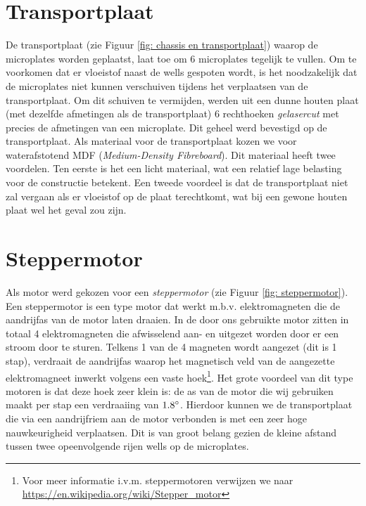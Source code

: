 \documentclass[a4paper,twoside,kulak]{kulakreport} %
\begin{document}
\section{Transportplaat}

De transportplaat (zie Figuur \ref{fig: chassis en transportplaat}) waarop de microplates worden geplaatst, laat toe om 6 microplates tegelijk te vullen. Om te voorkomen dat er vloeistof naast de wells gespoten wordt, is het noodzakelijk dat de microplates niet kunnen verschuiven tijdens het verplaatsen van de transportplaat. Om dit schuiven te vermijden, werden uit een dunne houten plaat (met dezelfde afmetingen als de transportplaat) 6 rechthoeken \textit{gelasercut} met precies de afmetingen van een microplate. Dit geheel werd bevestigd op de transportplaat. Als materiaal voor de transportplaat kozen we voor waterafstotend MDF (\textit{Medium-Density Fibreboard}). Dit materiaal heeft twee voordelen. Ten eerste is het een licht materiaal, wat een relatief lage belasting voor de constructie betekent. Een tweede voordeel is dat de transportplaat niet zal vergaan als er vloeistof op de plaat terechtkomt, wat bij een gewone houten plaat wel het geval zou zijn.  \\


\section{Steppermotor}

Als motor werd gekozen voor een \textit{steppermotor} (zie Figuur \ref{fig: steppermotor}). Een steppermotor is een type motor dat werkt m.b.v. elektromagneten die de aandrijfas van de motor laten draaien. In de door ons gebruikte motor zitten in totaal 4 elektromagneten die afwisselend aan- en uitgezet worden door er een stroom door te sturen. Telkens 1 van de 4 magneten wordt aangezet (dit is 1 stap), verdraait de aandrijfas waarop het magnetisch veld van de aangezette elektromagneet inwerkt volgens een vaste hoek\footnote{Voor meer informatie i.v.m. steppermotoren verwijzen we naar \url{https://en.wikipedia.org/wiki/Stepper_motor}}. Het grote voordeel van dit type motoren is dat deze hoek zeer klein is: de as van de motor die wij gebruiken maakt per stap een verdraaiing van $1.8\degree$. Hierdoor kunnen we de transportplaat die via een aandrijfriem aan de motor verbonden is met een zeer hoge nauwkeurigheid verplaatsen. Dit is van groot belang gezien de kleine afstand tussen twee opeenvolgende rijen wells op de microplates. 
\end{document}
